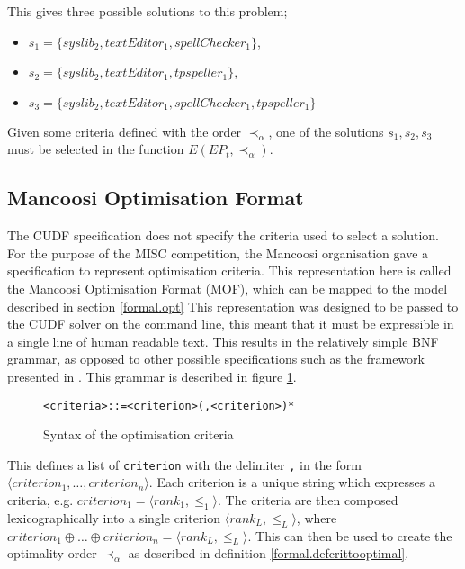 This gives three possible solutions to this problem;
\begin{itemize}
  \item $s_1 = \{syslib_2, textEditor_1, spellChecker_1\}$,
  \item $s_2 = \{syslib_2, textEditor_1, tpspeller_1\}$,
  \item $s_3 = \{syslib_2, textEditor_1, spellChecker_1, tpspeller_1\}$
\end{itemize}

Given some criteria defined with the order $\prec_{\alpha}$, one of the solutions $s_1,s_2,s_3$ must be selected in the function $E(EP_t,\prec_{\alpha})$. 

\subsection{Mancoosi Optimisation Format}
\label{formal.mancoosioptimisationformat}
The CUDF specification does not specify the criteria used to select a solution.
For the purpose of the MISC competition, the Mancoosi organisation gave a specification to represent optimisation criteria.
This representation here is called the Mancoosi Optimisation Format (MOF), which can be mapped to the model described in section \ref{formal.opt}
This representation was designed to be passed to the CUDF solver on the command line, this meant that it must be expressible in a single line of human readable text.
This results in the relatively simple BNF grammar, as opposed to other possible specifications such as the framework presented in \citep{Treinen2009}. 
This grammar is described in figure \ref{formal.optbnf}.

\begin{figure}[h!]
\begin{center}
\begin{alltt}
<criteria> ::= <criterion> (, <criterion>)*
\end{alltt}
  \caption{Syntax of the optimisation criteria}
  \label{formal.optbnf}
\end{center}
\end{figure}
This defines a list of \verb+criterion+ with the delimiter \verb+,+ in the form $\langle criterion_1, \ldots, criterion_n \rangle$.
Each criterion is a unique string which expresses a criteria, e.g. $criterion_1 = \langle rank_1, \leq_1 \rangle$.
The criteria are then composed lexicographically into a single criterion $\langle rank_L, \leq_L \rangle$, 
where $criterion_1 \oplus \ldots \oplus criterion_n = \langle rank_L, \leq_L \rangle$. 
This can then be used to create the optimality order $\prec_{\alpha}$ as described in definition \ref{formal.defcrittooptimal}.

